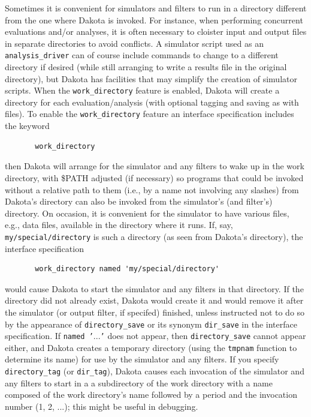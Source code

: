 Sometimes it is convenient for simulators and filters to run in a
directory different from the one where Dakota is invoked.  For instance,
when performing concurrent evaluations and/or analyses, it is often
necessary to cloister input and output files in separate directories to
avoid conflicts.  A simulator script used as an \texttt{analysis\_driver}
can of course include commands to change to a different directory if
desired (while still arranging to write a results file in the original
directory), but Dakota has facilities that may simplify the creation of
simulator scripts.  When the \texttt{work\_directory} feature is enabled,
Dakota will create a directory for each evaluation/analysis (with
optional tagging and saving as with files).  To enable the
\texttt{work\_directory} feature an interface specification includes
the keyword
\begin{small}
\begin{verbatim}
       work_directory
\end{verbatim}
\end{small}
then Dakota will arrange for the simulator and any filters to
wake up in the work directory, with \$PATH adjusted (if necessary)
so programs that could be invoked without a relative
path to them (i.e., by a name not involving any slashes) from
Dakota's directory can also be invoked from the simulator's (and filter's)
directory.  On occasion, it is convenient for the simulator to have
various files, e.g., data files, available in the directory where it
runs.  If, say, \texttt{my/special/directory} is such a directory
(as seen from Dakota's directory), the interface specification
\begin{small}
\begin{verbatim}
       work_directory named 'my/special/directory'
\end{verbatim}
\end{small}
would cause Dakota to start the simulator and any filters in that directory.
If the directory did not already exist, Dakota would create it
and would remove it after the simulator (or output filter, if specifed)
finished, unless instructed not to do so
by the appearance of \texttt{directory\_save} or its synonym \texttt{dir\_save}
in the interface specification.  If \texttt{named '$...$'} does not
appear, then \texttt{directory\_save} cannot appear either, and
Dakota creates a temporary directory (using the \texttt{tmpnam}
function to determine its name) for use by the simulator and any filters.
If you specify \texttt{directory\_tag} (or \texttt{dir\_tag}),
Dakota causes each invocation of the simulator and any filters to start in a
a subdirectory of the work directory with a name composed
of the work directory's name followed by a period and the
invocation number (1, 2, $...$); this might be useful in debugging.

